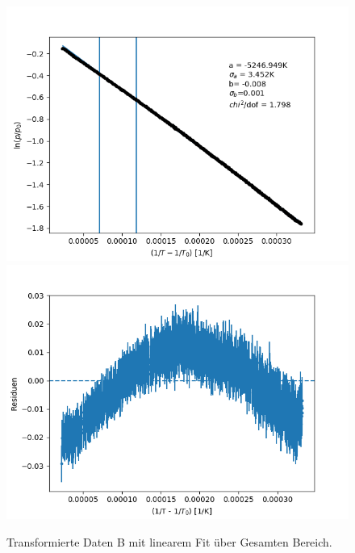 \documentclass[12pt,a4paper]{article}
\begin{document}
\begin{figure}[H]
\begin{center}
\includegraphics[width=0.9\linewidth]{Bilder/log_RohdatenB}
\includegraphics[width=0.9\linewidth]{Bilder/residuen_gesamt_B}
\caption[Rohdaten logarith. B]{Transformierte Daten B mit linearem Fit über Gesamten Bereich.}
\label{fig:logB}
\end{center}
\end{figure}
\end{document}
